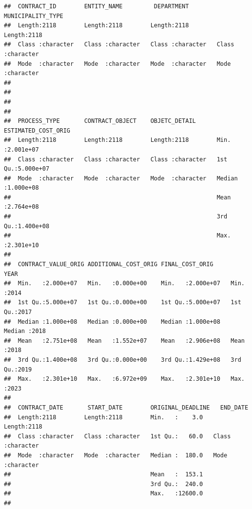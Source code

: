 \documentclass[
]{article}
\begin{document}
\begin{verbatim}
##  CONTRACT_ID        ENTITY_NAME         DEPARTMENT        MUNICIPALITY_TYPE 
##  Length:2118        Length:2118        Length:2118        Length:2118       
##  Class :character   Class :character   Class :character   Class :character  
##  Mode  :character   Mode  :character   Mode  :character   Mode  :character  
##                                                                             
##                                                                             
##                                                                             
##                                                                             
##  PROCESS_TYPE       CONTRACT_OBJECT    OBJETC_DETAIL      ESTIMATED_COST_ORIG
##  Length:2118        Length:2118        Length:2118        Min.   :2.001e+07  
##  Class :character   Class :character   Class :character   1st Qu.:5.000e+07  
##  Mode  :character   Mode  :character   Mode  :character   Median :1.000e+08  
##                                                           Mean   :2.764e+08  
##                                                           3rd Qu.:1.400e+08  
##                                                           Max.   :2.301e+10  
##                                                                              
##  CONTRACT_VALUE_ORIG ADDITIONAL_COST_ORIG FINAL_COST_ORIG          YEAR     
##  Min.   :2.000e+07   Min.   :0.000e+00    Min.   :2.000e+07   Min.   :2014  
##  1st Qu.:5.000e+07   1st Qu.:0.000e+00    1st Qu.:5.000e+07   1st Qu.:2017  
##  Median :1.000e+08   Median :0.000e+00    Median :1.000e+08   Median :2018  
##  Mean   :2.751e+08   Mean   :1.552e+07    Mean   :2.906e+08   Mean   :2018  
##  3rd Qu.:1.400e+08   3rd Qu.:0.000e+00    3rd Qu.:1.429e+08   3rd Qu.:2019  
##  Max.   :2.301e+10   Max.   :6.972e+09    Max.   :2.301e+10   Max.   :2023  
##                                                                             
##  CONTRACT_DATE       START_DATE        ORIGINAL_DEADLINE   END_DATE        
##  Length:2118        Length:2118        Min.   :    3.0   Length:2118       
##  Class :character   Class :character   1st Qu.:   60.0   Class :character  
##  Mode  :character   Mode  :character   Median :  180.0   Mode  :character  
##                                        Mean   :  153.1                     
##                                        3rd Qu.:  240.0                     
##                                        Max.   :12600.0                     
##                                                                            

\end{verbatim}
\end{document}
